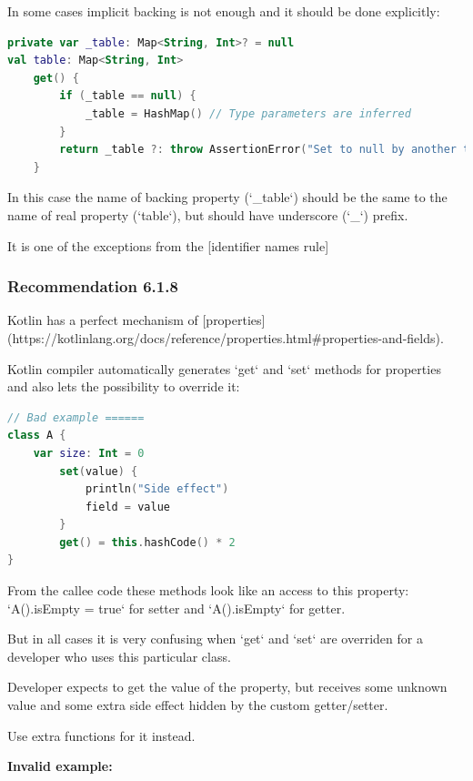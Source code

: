 {{{{In some cases implicit backing is not enough and it should be done explicitly:

\begin{lstlisting}[language=Kotlin]
private var _table: Map<String, Int>? = null
val table: Map<String, Int>
    get() {
        if (_table == null) {
            _table = HashMap() // Type parameters are inferred
        }
        return _table ?: throw AssertionError("Set to null by another thread")
    }
\end{lstlisting}


In this case the name of backing property (`_table`) should be the same to the name of real property (`table`), but should have underscore (`_`) prefix.

It is one of the exceptions from the [identifier names rule]



\subsubsection*{\textbf{Recommendation 6.1.8}}
\leavevmode\newline

Kotlin has a perfect mechanism of [properties](https://kotlinlang.org/docs/reference/properties.html\#properties-and-fields).

Kotlin compiler automatically generates `get` and `set` methods for properties and also lets the possibility to override it:

\begin{lstlisting}[language=Kotlin]
// Bad example ======
class A {
    var size: Int = 0
        set(value) {
            println("Side effect")
            field = value
        }
        get() = this.hashCode() * 2
}
\end{lstlisting}


From the callee code these methods look like an access to this property: `A().isEmpty = true` for setter and `A().isEmpty` for getter.

But in all cases it is very confusing when `get` and `set` are overriden for a developer who uses this particular class. 

Developer expects to get the value of the property, but receives some unknown value and some extra side effect hidden by the custom getter/setter. 

Use extra functions for it instead.



\textbf{Invalid example:}

}}}}

